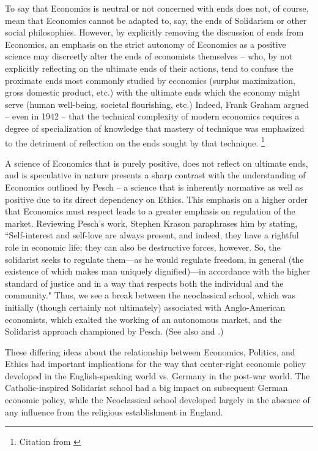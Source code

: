 \documentclass{article}
\begin{document}
To say that Economics is neutral or not concerned with ends does not, of course, mean that Economics cannot be adapted to, say, the ends of Solidarism or other social philosophies.  However, by explicitly removing the discussion of ends from Economics, an emphasis on the strict autonomy of Economics as a positive science may discreetly alter the ends of economists themselves – who, by not explicitly reflecting on the ultimate ends of their actions, tend to confuse the proximate ends most commonly studied by economics (surplus maximization, gross domestic product, etc.) with the ultimate ends which the economy might serve (human well-being, societal flourishing, etc.)  Indeed, Frank Graham argued – even in 1942 – that the technical complexity of modern economics requires a degree of specialization of knowledge that mastery of technique was emphasized to the detriment of reflection on the ends sought by that technique. \citep[p. 29]{graham1999}\footnote{Citation from \citet{yuengert2004}}\medskip

A science of Economics that is purely positive, does not reflect on ultimate ends, and is speculative in nature presents a sharp contrast with the understanding of Economics outlined by Pesch – a science that is inherently normative as well as positive due to its direct dependency on Ethics.  This emphasis on a higher order that Economics must respect leads to a greater emphasis on regulation of the market.  Reviewing Pesch’s work, Stephen Krason paraphrases him by stating, ``Self-interest and self-love are always present, and indeed, they have a rightful role in economic life; they can also be destructive forces, however. So, the solidarist seeks to regulate them—as he would regulate freedom, in general (the existence of which makes man uniquely dignified)—in accordance with the higher standard of justice and in a way that respects both the individual and the community." \citep{krason2009}  Thus, we see a break between the neoclassical school, which was initially (though certainly not ultimately) associated with Anglo-American economists, which exalted the working of an autonomous market, and the Solidarist approach championed by Pesch.  (See also \citet{mulcahy1951} and \citet{yenni1951}.) \medskip

These differing ideas about the relationship between Economics, Politics, and Ethics had important implications for the way that center-right economic policy developed in the English-speaking world vs. Germany in the post-war world.  The Catholic-inspired Solidarist school had a big impact on subsequent German economic policy, while the Neoclassical school developed largely in the absence of any influence from the religious establishment in England.
\end{document}

